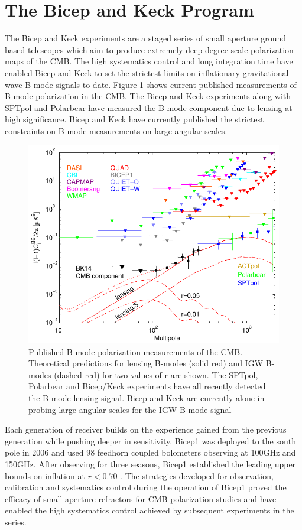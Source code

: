 \documentclass[12pt]{article}
\begin{document}
\section{The Bicep and Keck Program}
The Bicep and Keck experiments are a staged series of small aperture ground based
telescopes which aim to produce extremely deep degree-scale polarization maps
of the CMB. The high systematics control and long integration time have
enabled Bicep and Keck to set the strictest limits on inflationary
gravitational wave B-mode signals to date. Figure \ref{fig:BK_vs_world} shows
current published measurements of B-mode polarization in the CMB. The Bicep
and Keck experiments along with SPTpol and Polarbear have measured the B-mode
component due to lensing at high significance. Bicep and Keck have currently
published the strictest constraints on B-mode measurements on large angular
scales.

\begin{figure}
	\center
	\includegraphics[width=.7\textwidth]{bk14_vs_world.pdf}
	\caption{Published B-mode polarization measurements of the CMB.
	Theoretical predictions for lensing B-modes (solid red) and IGW B-modes
	(dashed red) for two values of r are shown. The SPTpol, Polarbear and
	Bicep/Keck experiments have all recently detected the B-mode lensing
	signal. Bicep and Keck are currently alone in probing large
	angular scales for the IGW B-mode signal}
	\label{fig:BK_vs_world}
\end{figure}


Each generation of receiver builds on the experience gained from
the previous generation while pushing deeper in sensitivity.
Bicep1 was deployed to the south pole in 2006 and used 98 feedhorn coupled
bolometers observing at 100GHz and 150GHz. After observing for three seasons,
Bicep1 established the leading  upper bounds on inflation at $r<0.70$
\cite{cite:Bicep1}. The strategies developed for observation, calibration and
systematics control during the operation of Bicep1 proved the efficacy of
small aperture refractors for CMB polarization studies and have enabled the
high systematics control achieved by subsequent experiments in the series.
\end{document}
